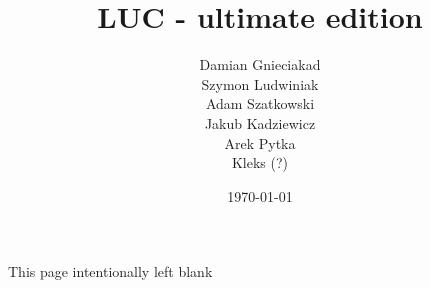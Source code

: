 \documentclass[titlepage]{article}
\title{LUC - ultimate edition}
\date{\today}
\author{Damian Gnieciakad \\ Szymon Ludwiniak \\ Adam Szatkowski \\ Jakub Kadziewicz \\ Arek Pytka \\ Kleks (?)}
\begin{document}
\begin{titlepage} 
    \maketitle 
\end{titlepage}

\newpage

\tableofcontents

\newpage

\hspace{0px}
\vfill
    \begin{center}
        This page intentionally left blank
    \end{center}
\vfill

\newpage



\newpage



\newpage



\newpage



\newpage



\newpage



\newpage



\newpage



\newpage



\newpage



\newpage


\end{document}
